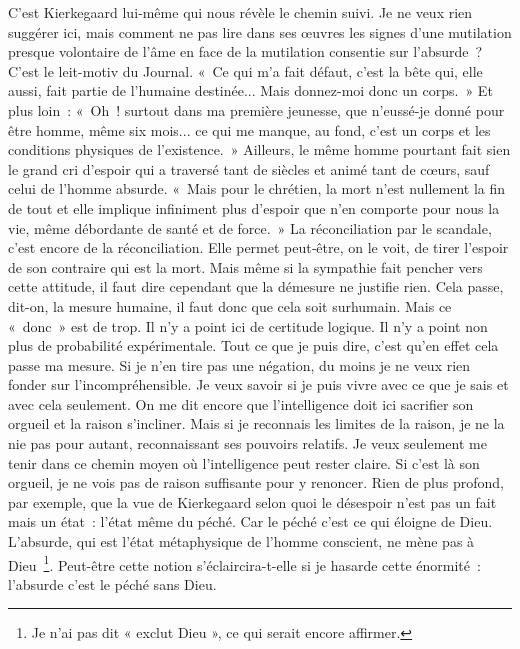 \documentclass{book}
\begin{document}
C'est Kierkegaard lui‑même qui nous révèle le chemin suivi. Je ne veux rien suggérer ici, mais comment ne pas lire dans ses œuvres les signes d'une mutilation presque volontaire de l'âme en face de la mutilation consentie sur l'absurde ? C'est le leit-motiv du Journal. « Ce qui m'a fait défaut, c'est la bête qui, elle aussi, fait partie de l'humaine destinée... Mais donnez-moi donc un corps. » Et plus loin : « Oh ! surtout dans ma première jeunesse, que n'eussé-je donné pour être homme, même six mois... ce qui me manque, au fond, c'est un corps et les conditions physiques de l'existence. » Ailleurs, le même homme pourtant fait sien le grand cri d'espoir qui a traversé tant de siècles et animé tant de cœurs, sauf celui de l'homme absurde. « Mais pour le chrétien, la mort n'est nullement la fin de tout et elle implique infiniment plus d'espoir que n'en comporte pour nous la vie, même débordante de santé et de force. » La réconciliation par le scandale, c'est encore de la réconciliation. Elle permet peut‑être, on le voit, de tirer l’espoir de son contraire qui est la mort. Mais même si la sympathie fait pencher vers cette attitude, il faut dire cependant que la démesure ne justifie rien. Cela passe, dit-on, la mesure humaine, il faut donc que cela soit surhumain. Mais ce « donc » est de trop. Il n'y a point ici de certitude logique. Il n'y a point non plus de probabilité expérimentale. Tout ce que je puis dire, c'est qu'en effet cela passe ma mesure. Si je n'en tire pas une négation, du moins je ne veux rien fonder sur l'incompréhensible. Je veux savoir si je puis vivre avec ce que je sais et avec cela seulement. On me dit encore que l'intelligence doit ici sacrifier son orgueil et la raison s'incliner. Mais si je reconnais les limites de la raison, je ne la nie pas pour autant, reconnaissant ses pouvoirs relatifs. Je veux seulement me tenir dans ce chemin moyen où l'intelligence peut rester claire. Si c'est là son orgueil, je ne vois pas de raison suffisante pour y renoncer. Rien de plus profond, par exemple, que la vue de Kierkegaard selon quoi le désespoir n'est pas un fait mais un état : l'état même du péché. Car le péché c'est ce qui éloigne de Dieu. L'absurde, qui est l'état métaphysique de l'homme conscient, ne mène pas à Dieu \footnote{Je n’ai pas dit « exclut Dieu », ce qui serait encore affirmer.}. Peut-être cette notion s'éclaircira-t-elle si je hasarde cette énormité : l'absurde c'est le péché sans Dieu.
\end{document}
